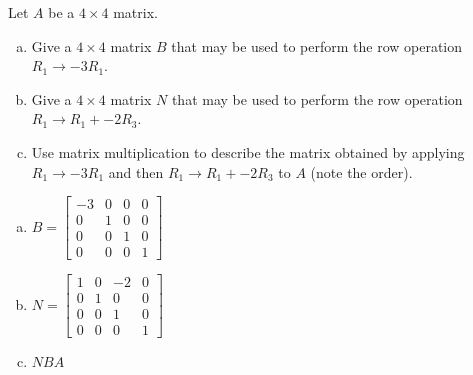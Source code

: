 
\begin{exerciseStatement}


Let \(A\) be a \(4 \times 4\) matrix.


\begin{enumerate}[(a)]
\item Give a \(4 \times 4\) matrix \(B\) that may be used to perform the row operation \( R_1 \to -3R_1 \).
\item Give a \(4 \times 4\) matrix \(N\) that may be used to perform the row operation \( R_1 \to R_1 + -2R_3 \).
\item Use matrix multiplication to describe the matrix obtained by applying \( R_1 \to -3R_1 \) and then \( R_1 \to R_1 + -2R_3 \) to \(A\) (note the order). 
\end{enumerate}
    
\end{exerciseStatement}
    
\begin{exerciseAnswer} 

\begin{enumerate}[(a)]
\item \(B= \left[\begin{array}{cccc}
-3 & 0 & 0 & 0 \\
0 & 1 & 0 & 0 \\
0 & 0 & 1 & 0 \\
0 & 0 & 0 & 1
\end{array}\right] \)
\item \(N= \left[\begin{array}{cccc}
1 & 0 & -2 & 0 \\
0 & 1 & 0 & 0 \\
0 & 0 & 1 & 0 \\
0 & 0 & 0 & 1
\end{array}\right] \)
\item \(NBA\)
\end{enumerate}
    
\end{exerciseAnswer}
    
